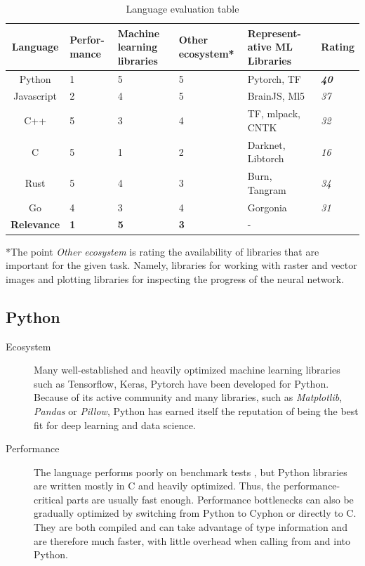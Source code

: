 \documentclass[12pt, a4paper, titlepage]{report}
\begin{document}
\begin{table}[h]
   \begin{tabular} {|c||p{2.0cm}|p{2.5cm}|p{2.5cm}|p{3.0cm}||p{1.5cm}|}
      \hline
      \textbf{Language}    & \textbf{Perfor-mance} & \textbf{Machine learning libraries} & \textbf{Other ecosystem*} & \textbf{Represent-ative ML Libraries} & \textbf{Rating} \\
      \hline
      Python      & 1 & 5 & 5 & Pytorch, TF        & \textbf{\emph{40}} \\ \hline
      Javascript  & 2 & 4 & 5 & BrainJS, Ml5       & \emph{37} \\ \hline
      C++         & 5 & 3 & 4 & TF, mlpack, CNTK   & \emph{32} \\ \hline
      C           & 5 & 1 & 2 & Darknet, Libtorch  & \emph{16} \\ \hline
      Rust        & 5 & 4 & 3 & Burn, Tangram      & \emph{34} \\ \hline
      Go          & 4 & 3 & 4 & Gorgonia           & \emph{31} \\
      \hline\hline
      \textbf{Relevance} & \textbf{1} & \textbf{5} & \textbf{3} & - & \\
      \hline
   \end{tabular}
   \caption{Language evaluation table\\}
   *The point \emph{Other ecosystem} is rating the availability of libraries that are important for the given task. Namely, libraries for working with raster and vector images and plotting libraries for inspecting the progress of the neural network.

   \label{table:language_evaluation}
\end{table}

\vspace{0.5cm}
{
   \center
   \subsection*{Python}
}
\begin{description}
   \item[Ecosystem] Many well-established and heavily optimized machine learning libraries such as Tensorflow, Keras, Pytorch have been developed for Python. Because of its active community and many libraries, such as \emph{Matplotlib}, \emph{Pandas} or \emph{Pillow}, Python has earned itself the reputation of being the best fit for deep learning and data science.
   \item[Performance] The language performs poorly on benchmark tests \cite{goodmanwen_programming-language-benchmarks-visualization_2023}, but Python libraries are written mostly in C and heavily optimized. Thus, the performance-critical parts are usually fast enough. Performance bottlenecks can also be gradually optimized by switching from Python to Cyphon or directly to C. They are both compiled and can take advantage of type information and are therefore much faster, with little overhead when calling from and into Python.
\end{description}
\end{document}
